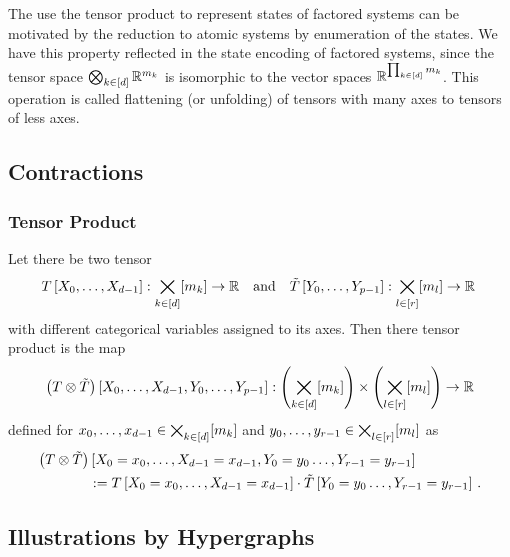 \begin{remark}
	The use the tensor product to represent states of factored systems can be motivated by the reduction to atomic systems by enumeration of the states.
	We have this property reflected in the state encoding of factored systems, since the tensor space $\bigotimes_{k\in[d]}\mathbb{R}^{m_{k}}$ is isomorphic to the vector spaces $\mathbb{R}^{\prod_{k\in[d]}m_{k}}$.
	This operation is called flattening (or unfolding) of tensors with many axes to tensors of less axes.
\end{remark}



\subsection{Contractions}



\subsubsection{Tensor Product}



\begin{definition}\label{def:tensorProduct}
	Let there be two tensor
	\begin{align*}
		T\left[X_{0},\ldots,X_{d-1}\right] : \bigtimes_{k\in[d]}[m_{k}] \rightarrow \mathbb{R} \quad \text{and} \quad  \tilde{T}\left[Y_{0},\ldots,Y_{p-1}\right] : \bigtimes_{l\in[r]}[m_{l}] \rightarrow \mathbb{R} \, 
	\end{align*}
	with different categorical variables assigned to its axes.
	Then there tensor product is the map
	\begin{align*}
		\left(T \otimes \tilde{T}\right)\left[X_{0},\ldots,X_{d-1},Y_{0},\ldots,Y_{p-1} \right] :  \left(\bigtimes_{k\in[d]}[m_{k}]\right) \times \left(\bigtimes_{l\in[r]}[m_{l}]\right) \rightarrow \mathbb{R}
	\end{align*}
	defined for $x_{0},\ldots,x_{d-1}\in\bigtimes_{k\in[d]}[m_{k}]$ and ${y_{0},\ldots,y_{r-1}}\in\bigtimes_{l\in[r]}[m_{l}]$ as
	\begin{align*}
		\left(T \otimes \tilde{T}\right)&\left[X_{0}=x_{0},\ldots,X_{d-1}=x_{d-1},Y_{0}=y_{0}\ldots,Y_{r-1}=y_{r-1} \right] \\
		&:=  T\left[X_{0}=x_{0},\ldots,X_{d-1}=x_{d-1}\right]\cdot \tilde{T}\left[Y_{0}=y_{0}\ldots,Y_{r-1}=y_{r-1}\right] \, .
	\end{align*}
\end{definition}


\subsection{Illustrations by Hypergraphs}

